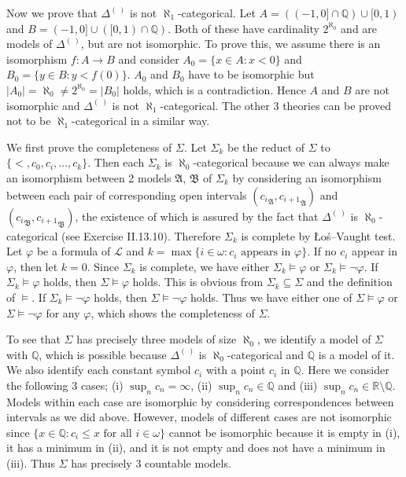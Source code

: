 \documentclass[12pt]{article}
\theoremstyle{definition}
\newenvironment{customthm}[1]
  {\renewcommand\theinnercustomthm{#1}\innercustomthm}
  {\endinnercustomthm}
\begin{document}
\begin{customthm}{II.13.10}
Now we prove that $\Delta^{(~)}$ is not $\aleph_1$-categorical. Let $A=((-1,0]\cap\mathbb{Q})\cup[0,1)$ and $B=(-1,0]\cup([0,1)\cap\mathbb{Q})$. Both of these have cardinality $2^{\aleph_0}$ and are models of $\Delta^{(~)}$, but are not isomorphic. To prove this, we assume there is an isomorphism $f:A\rightarrow B$ and consider $A_0=\{x\in A:x<0\}$ and $B_0=\{y\in B:y<f(0)\}$. $A_0$ and $B_0$ have to be isomorphic but $|A_0|=\aleph_0\neq2^{\aleph_0}=|B_0|$ holds, which is a contradiction. Hence $A$ and $B$ are not isomorphic and $\Delta^{(~)}$ is not $\aleph_1$-categorical. The other 3 theories can be proved not to be $\aleph_1$-categorical in a similar way.
\end{customthm}

\begin{customthm}{II.13.11} We first prove the completeness of $\Sigma$. Let $\Sigma_k$ be the reduct of $\Sigma$ to  $\{<,c_0,c_i,\ldots,c_k\}$. Then each $\Sigma_k$ is $\aleph_0$-categorical because we can always make an isomorphism between 2 models $\mathfrak{A}$, $\mathfrak{B}$ of $\Sigma_k$ by considering an isomorphism between each pair of corresponding open intervals $({c_{i}}_\mathfrak{A},{c_{i+1}}_\mathfrak{A})$ and $({c_{i}}_\mathfrak{B},{c_{i+1}}_\mathfrak{B})$, the existence of which is assured by the fact that $\Delta^{(~)}$ is $\aleph_0$-categorical (see Exercise II.13.10). Therefore $\Sigma_k$ is complete by Łoś–Vaught test. Let $\varphi$ be a formula of $\mathcal{L}$ and $k=\max\{i\in\omega:c_i \text{ appears in } \varphi\}$. If no $c_i$ appear in $\varphi$, then let $k=0$. Since $\Sigma_k$ is complete, we have either $\Sigma_k\models\varphi$ or $\Sigma_k\models\neg\varphi$. If $\Sigma_k\models\varphi$ holds, then $\Sigma\models\varphi$ holds. This is obvious from $\Sigma_k\subseteq\Sigma$ and the definition of $\models$. If $\Sigma_k\models\neg\varphi$ holds, then $\Sigma\models\neg\varphi$ holds. Thus we have either one of $\Sigma\models\varphi$ or $\Sigma\models\neg\varphi$ for any $\varphi$, which shows the completeness of $\Sigma$.

To see that $\Sigma$ has precisely three models of size $\aleph_0$, we identify a model of $\Sigma$ with $\mathbb{Q}$, which is possible because $\Delta^{(~)}$ is $\aleph_0$-categorical and $\mathbb{Q}$ is a model of it. We also identify each constant symbol $c_i$ with a point $c_i$ in $\mathbb{Q}$. Here we consider the following 3 cases; (i) $\sup_n c_n=\infty$, (ii) $\sup_n c_n\in\mathbb{Q}$ and (iii) $\sup_n c_n\in\mathbb{R}\setminus\mathbb{Q}$. Models within each case are isomorphic by considering correspondences between intervals as we did above. However, models of different cases are not isomorphic since $\{x\in\mathbb{Q}:c_i\leq x \text{ for all } i\in\omega\}$ cannot be isomorphic because it is empty in (i), it has a minimum in (ii), and it is not empty and does not have a minimum in (iii). Thus $\Sigma$ has precisely 3 countable models.
\end{customthm}
\end{document}
